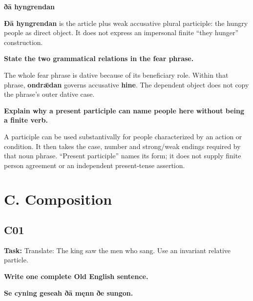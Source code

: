 \textbf{ðā hyngrendan}

\textbf{Ðā hyngrendan} is the article plus weak accusative plural participle: the hungry people as direct object. It does not express an impersonal finite “they hunger” construction.

\textbf{State the two grammatical relations in the fear phrase.}

The whole fear phrase is dative because of its beneficiary role. Within that phrase, \textbf{ondrǣdan} governs accusative \textbf{hine}. The dependent object does not copy the phrase's outer dative case.

\textbf{Explain why a present participle can name people here without being a finite verb.}

A participle can be used substantivally for people characterized by an action or condition. It then takes the case, number and strong/\allowbreak{}weak endings required by that noun phrase. “Present participle” names its form; it does not supply finite person agreement or an independent present-tense assertion.

\section*{C. Composition}

\subsection*{C01}

\textbf{Task:} Translate: The king saw the men who sang. Use an invariant relative particle.

\textbf{Write one complete Old English sentence.}

\textbf{Se cyning geseah ðā męnn ðe sungon.}

